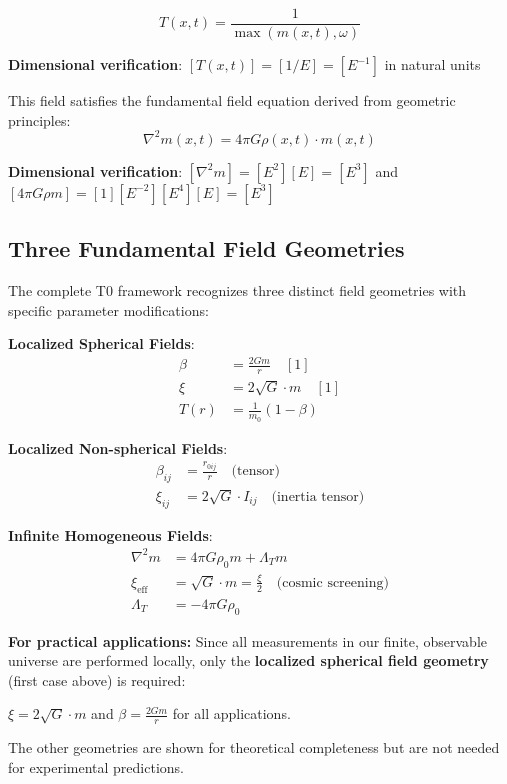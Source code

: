 \documentclass[12pt,a4paper]{article}
\newcommand{\Tfield}{T(x,t)}
\newcommand{\mfield}{m(x,t)}
\theoremstyle{definition}
\theoremstyle{remark}
\begin{document}
	\begin{equation}
		\boxed{\Tfield = \frac{1}{\max(\mfield, \omega)}}
		\label{eq:intrinsic_time_field}
	\end{equation}
	
	\textbf{Dimensional verification}: $[\Tfield] = [1/E] = [E^{-1}]$ in natural units \checkmark
	
	This field satisfies the fundamental field equation derived from geometric principles:
	\begin{equation}
		\nabla^2 \mfield = 4\pi G \rho(x,t) \cdot \mfield
		\label{eq:field_equation}
	\end{equation}
	
	\textbf{Dimensional verification}: $[\nabla^2 m] = [E^2][E] = [E^3]$ and $[4\pi G \rho m] = [1][E^{-2}][E^4][E] = [E^3]$ \checkmark
	
	\subsection{Three Fundamental Field Geometries}
	\label{subsec:three_geometries}
	
	The complete T0 framework recognizes three distinct field geometries with specific parameter modifications:
	
	\begin{tcolorbox}[colback=blue!5!white,colframe=blue!75!black,title=T0 Model Parameter Framework]
		\textbf{Localized Spherical Fields}:
		\begin{align}
			\beta &= \frac{2Gm}{r} \quad [1] \\
			\xi &= 2\sqrt{G} \cdot m \quad [1] \\
			T(r) &= \frac{1}{m_0}(1 - \beta)
		\end{align}
		
		\textbf{Localized Non-spherical Fields}:
		\begin{align}
			\beta_{ij} &= \frac{r_{0ij}}{r} \quad \text{(tensor)} \\
			\xi_{ij} &= 2\sqrt{G} \cdot I_{ij} \quad \text{(inertia tensor)}
		\end{align}
		
		\textbf{Infinite Homogeneous Fields}:
		\begin{align}
			\nabla^2 m &= 4\pi G \rho_0 m + \Lambda_T m \\
			\xi_{\text{eff}} &= \sqrt{G} \cdot m = \frac{\xi}{2} \quad \text{(cosmic screening)} \\
			\Lambda_T &= -4\pi G \rho_0
		\end{align}
	\end{tcolorbox}
\begin{tcolorbox}[colback=yellow!5!white,colframe=orange!75!black,title=Practical Simplification Note]
	\textbf{For practical applications:} Since all measurements in our finite, observable universe are performed locally, only the \textbf{localized spherical field geometry} (first case above) is required:
	
	$\xi = 2\sqrt{G} \cdot m$ and $\beta = \frac{2Gm}{r}$ for all applications.
	
	The other geometries are shown for theoretical completeness but are not needed for experimental predictions.
\end{tcolorbox}	
\end{document}
